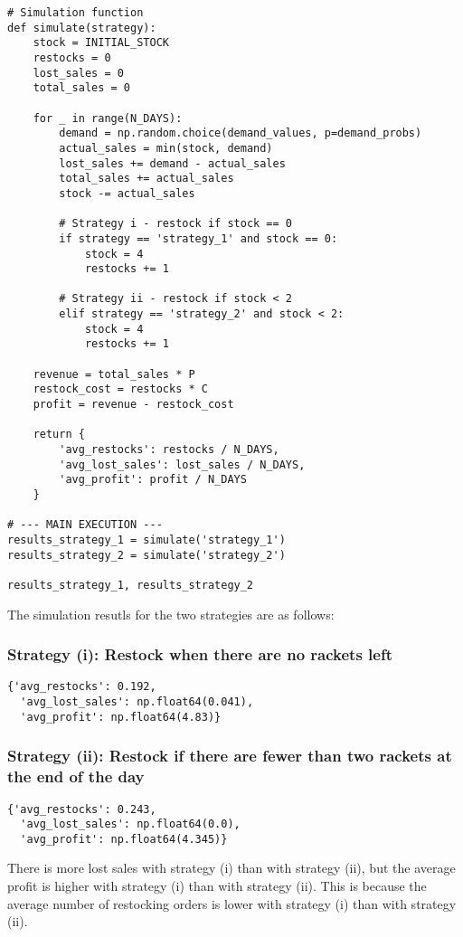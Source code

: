 \documentclass[12pt]{article}
\begin{document}
\begin{enumerate}
\begin{enumerate}
\begin{verbatim}
# Simulation function
def simulate(strategy):
    stock = INITIAL_STOCK
    restocks = 0
    lost_sales = 0
    total_sales = 0

    for _ in range(N_DAYS):
        demand = np.random.choice(demand_values, p=demand_probs)
        actual_sales = min(stock, demand)
        lost_sales += demand - actual_sales
        total_sales += actual_sales
        stock -= actual_sales

        # Strategy i - restock if stock == 0
        if strategy == 'strategy_1' and stock == 0:
            stock = 4
            restocks += 1

        # Strategy ii - restock if stock < 2
        elif strategy == 'strategy_2' and stock < 2:
            stock = 4
            restocks += 1

    revenue = total_sales * P
    restock_cost = restocks * C
    profit = revenue - restock_cost

    return {
        'avg_restocks': restocks / N_DAYS,
        'avg_lost_sales': lost_sales / N_DAYS,
        'avg_profit': profit / N_DAYS
    }

# --- MAIN EXECUTION ---
results_strategy_1 = simulate('strategy_1')
results_strategy_2 = simulate('strategy_2')

results_strategy_1, results_strategy_2
\end{verbatim}

The simulation resutls for the two strategies are as follows:

\subsubsection*{Strategy (i): Restock when there are no rackets left}
\begin{verbatim}
{'avg_restocks': 0.192,
  'avg_lost_sales': np.float64(0.041),
  'avg_profit': np.float64(4.83)}
\end{verbatim}

\subsubsection*{Strategy (ii): Restock if there are fewer than two rackets at the end of the day}
\begin{verbatim}
{'avg_restocks': 0.243,
  'avg_lost_sales': np.float64(0.0),
  'avg_profit': np.float64(4.345)}
\end{verbatim}

There is more lost sales with strategy (i) than with strategy (ii), but the average profit is higher with strategy (i) than with strategy (ii). This is because the average number of restocking orders is lower with strategy (i) than with strategy (ii).


\end{enumerate}
\end{enumerate}
\end{document}
